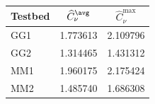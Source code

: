 \begin{tabular}{lcc}
\toprule
Testbed & $\widehat C_\nu^{\avg}$ & $\widehat C_\nu^{\max}$ \\
\midrule
GG1 & 1.773613 & 2.109796 \\
GG2 & 1.314465 & 1.431312 \\
MM1 & 1.960175 & 2.175424 \\
MM2 & 1.485740 & 1.686308 \\
\bottomrule
\end{tabular}